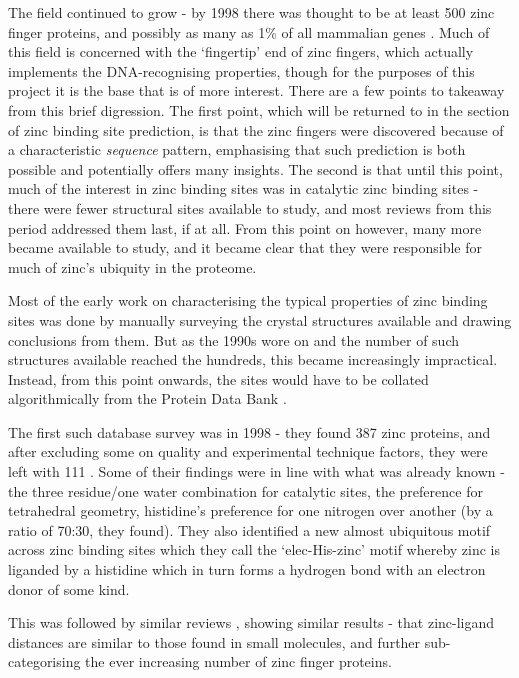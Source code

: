 The field continued to grow - by 1998 there was thought to be at least 500 zinc finger proteins, and possibly as many as 1\% of all mammalian genes \cite{mackay1998zinc}. Much of this field is concerned with the `fingertip' end of zinc fingers, which actually implements the DNA-recognising properties, though for the purposes of this project it is the base that is of more interest. There are a few points to takeaway from this brief digression. The first point, which will be returned to in the section of zinc binding site prediction, is that the zinc fingers were discovered because of a characteristic \textit{sequence} pattern, emphasising that such prediction is both possible and potentially offers many insights. The second is that until this point, much of the interest in zinc binding sites was in catalytic zinc binding sites - there were fewer structural sites available to study, and most reviews from this period addressed them last, if at all. From this point on however, many more became available to study, and it became clear that they were responsible for much of zinc's ubiquity in the proteome.

Most of the early work on characterising the typical properties of zinc binding sites was done by manually surveying the crystal structures available and drawing conclusions from them. But as the 1990s wore on and the number of such structures available reached the hundreds, this became increasingly impractical. Instead, from this point onwards, the sites would have to be collated algorithmically from the Protein Data Bank \cite{berman2000pdb}.

The first such database survey was in 1998 - they found 387 zinc proteins, and after excluding some on quality and experimental technique factors, they were left with 111 \cite{alberts1998analysis}. Some of their findings were in line with what was already known - the three residue/one water combination for catalytic sites, the preference for tetrahedral geometry, histidine's preference for one nitrogen over another (by a ratio of 70:30, they found). They also identified a new almost ubiquitous motif across zinc binding sites which they call the `elec-His-zinc' motif whereby zinc is liganded by a histidine which in turn forms a hydrogen bond with an electron donor of some kind.

This was followed by similar reviews \cite{roe1999zinc,laity2001zinc,grishin2001treble,harding2001geometry,krishna2003structural}, showing similar results - that zinc-ligand distances are similar to those found in small molecules, and further sub-categorising the ever increasing number of zinc finger proteins.

